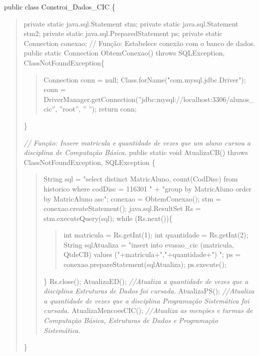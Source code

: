 public class Constroi\_Dados\_CIC \{ 
\begin{quote}
	private static java.sql.Statement stm; \newline
	private static java.sql.Statement stm2; \newline
	private static java.sql.PreparedStatement ps; \newline
	private static Connection conexao; \newline
	\newline
	//	Função: Estabelece conexão com o banco de dados. \newline
	public static Connection ObtemConexao() throws SQLException, ClassNotFoundException\{
		\begin{quote}
		Connection conn = null; \newline
		Class.forName("com.mysql.jdbc.Driver"); \newline
		conn = DriverManager.getConnection(''jdbc:mysql://localhost:3306/alunos\_cic'', ''root'', '' ''); \newline
		return conn;
		\end{quote}
	\}  
	
	\textit{// Função: Insere matricula e quantidade de vezes que um aluno cursou a disciplina de Computação Básica.} \newline
	public static void AtualizaCB() throws ClassNotFoundException, SQLException \{	
	\begin{quote}
		String sql = "select distinct MatricAluno, count(CodDisc) from historico where codDisc = 116301 " \newline
		+ "group by MatricAluno order by MatricAluno asc"; \newline
		conexao = ObtemConexao(); \newline
		stm = conexao.createStatement(); \newline
		java.sql.ResultSet Rs = stm.executeQuery(sql); \newline
		while (Rs.next())\{
		\begin{quote}
			int matricula = Rs.getInt(1); \newline
			int quantidade =  Rs.getInt(2); \newline
			String sqlAtualiza = "insert into evasao\_cic (matricula, QtdeCB) values ("+matricula+","+quantidade+") "; \newline
			ps = conexao.prepareStatement(sqlAtualiza); \newline
			ps.execute(); 
			\end{quote}
		\} \newline
		Rs.close(); \newline
		AtualizaED(); \textit{//Atualiza a quantidade de vezes que a disciplina Estruturas de Dados foi cursada.}\newline
		AtualizaPS(); \textit{//Atualiza a quantidade de vezes que a disciplina Programação Sistemática foi cursada.}\newline
		AtualizaMencoesCIC(); \textit{//Atualiza as menções e turmas de Computação Básica, Estruturas de Dados e Programação Sistemática.}
		\end{quote}
	\} \newline
	

\end{quote}
